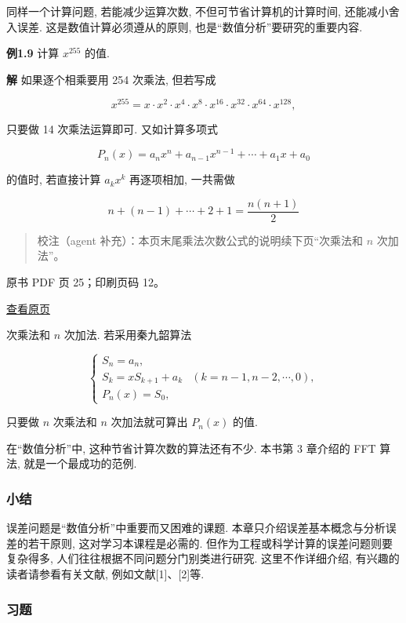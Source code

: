 同样一个计算问题, 若能减少运算次数, 不但可节省计算机的计算时间, 还能减小舍入误差. 这是数值计算必须遵从的原则, 也是``数值分析''要研究的重要内容.

\textbf{例1.9} 计算 \(x^{255}\) 的值.

\textbf{解} 如果逐个相乘要用 254 次乘法, 但若写成

\[
x^{255} = x \cdot x^2 \cdot x^4 \cdot x^8 \cdot x^{16} \cdot x^{32} \cdot x^{64} \cdot x^{128},
\]

只要做 14 次乘法运算即可. 又如计算多项式

\[
P_n(x) = a_n x^n + a_{n-1} x^{n-1} + \cdots + a_1 x + a_0
\]

的值时, 若直接计算 \(a_k x^k\) 再逐项相加, 一共需做

\[
n + (n-1) + \cdots + 2 + 1 = \frac{n(n+1)}{2}
\]

\begin{quote}
校注（agent 补充）：本页末尾乘法次数公式的说明续下页``次乘法和 \(n\) 次加法''。
\end{quote}

\clearpage

原书 PDF 页 25；印刷页码 12。

\href{source-images/pdf-025.jpeg}{查看原页}

次乘法和 \(n\) 次加法. 若采用秦九韶算法

\[
\begin{cases} S_n = a_n, \\ S_k = xS_{k+1} + a_k & (k=n-1,n-2,\cdots,0), \\ P_n(x) = S_0, \end{cases} \tag{1.4.1}
\]

只要做 \(n\) 次乘法和 \(n\) 次加法就可算出 \(P_n(x)\) 的值.

在``数值分析''中, 这种节省计算次数的算法还有不少. 本书第 3 章介绍的 FFT 算法, 就是一个最成功的范例.

\subsubsection{小结}\label{ch01-ux5c0fux7ed3}

误差问题是``数值分析''中重要而又困难的课题. 本章只介绍误差基本概念与分析误差的若干原则, 这对学习本课程是必需的. 但作为工程或科学计算的误差问题则要复杂得多, 人们往往根据不同问题分门别类进行研究. 这里不作详细介绍, 有兴趣的读者请参看有关文献, 例如文献{[}1{]}、{[}2{]}等.

\subsubsection{习题}\label{ch01-ux4e60ux9898}

